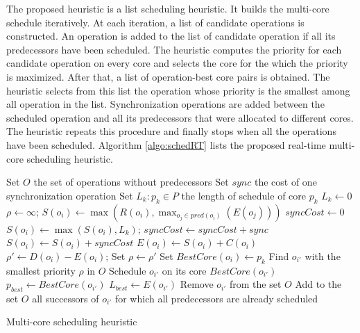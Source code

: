 The proposed heuristic is a list scheduling heuristic. It builds the multi-core schedule iteratively. At each iteration, a list of candidate operations is constructed. An operation is added to the list of candidate operation if all its predecessors have been scheduled. The heuristic computes the priority for each candidate operation on every core and selects the core for the which the priority is maximized. After that, a list of operation-best core pairs is obtained. The heuristic selects from this list the operation whose priority is the smallest among all operation in the list. Synchronization operations are added between the scheduled operation and all its predecessors that were allocated to different cores. The heuristic repeats this procedure and finally stops when all the operations have been scheduled. Algorithm \ref{algo:schedRT} lists the proposed real-time multi-core scheduling heuristic. 

\begin{algorithm}[!htp]		
 		Set $O$ the set of operations without predecessors\;
		Set $sync$ the cost of one synchronization operation\;
		Set $L_k: p_k \in P$ the length of schedule of core $p_k$\;
		{
			$L_k \leftarrow 0$\;
		}
		{
			{
 				$\rho \leftarrow \infty$; 
				$S(o_i) \leftarrow \max(R(o_i),\max_{o_j \in pred(o_i)}(E(o_j)))$\;
				{
  				$syncCost \leftarrow 0$\;
				$S(o_i) \leftarrow \max(S(o_i) , L_k)$; 
					{
						{
							$syncCost \leftarrow syncCost + sync$\; 
						}
					}
				$S(o_i) \leftarrow S(o_i) + syncCost$\;
				$E(o_i) \leftarrow S(o_i) + C(o_i)$\;
  				$\rho' \leftarrow D(o_i) - E(o_i)$; 
					{
  					Set $\rho \leftarrow \rho'$\;
  					Set $BestCore(o_i) \leftarrow p_k$\;
  				}
  			}
  		 }
  		 Find $o_{i'}$ with the smallest priority $\rho$ in $O$\; 
  		 Schedule $o_{i'}$ on its core $BestCore(o_{i'})$\;
  		 $p_{best} \leftarrow BestCore(o_{i'})$\;
  		 $L_{best} \leftarrow E(o_{i'})$\;
  		 Remove $o_{i'}$ from the set $O$\;
  		 Add to the set $O$ all successors of $o_{i'}$ for which all predecessors are already scheduled\;
		}
	\caption{Multi-core scheduling heuristic}
	\label{algo:schedRT}
\end{algorithm}

